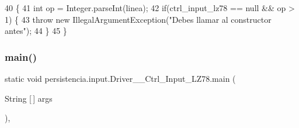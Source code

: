 \begin{DoxyCode}
40                                                                                           \{
41         \textcolor{keywordtype}{int} op = Integer.parseInt(linea);
42         \textcolor{keywordflow}{if}(ctrl\_input\_lz78 == null && op > 1) \{
43             \textcolor{keywordflow}{throw} \textcolor{keyword}{new} IllegalArgumentException(\textcolor{stringliteral}{"Debes llamar al constructor antes"});
44         \}
45     \}
\end{DoxyCode}
\mbox{\label{classpersistencia_1_1input_1_1Driver____Ctrl__Input__LZ78_adb756847df72081fa229549543e03569}} 
\subsubsection{\texorpdfstring{main()}{main()}}
{\footnotesize\ttfamily static void persistencia.\+input.\+Driver\+\_\+\+\_\+\+Ctrl\+\_\+\+Input\+\_\+\+L\+Z78.\+main (\begin{DoxyParamCaption}\item[{String \mbox{[}$\,$\mbox{]}}]{args }\end{DoxyParamCaption})\hspace{0.3cm}{\ttfamily [inline]}, {\ttfamily [static]}}


